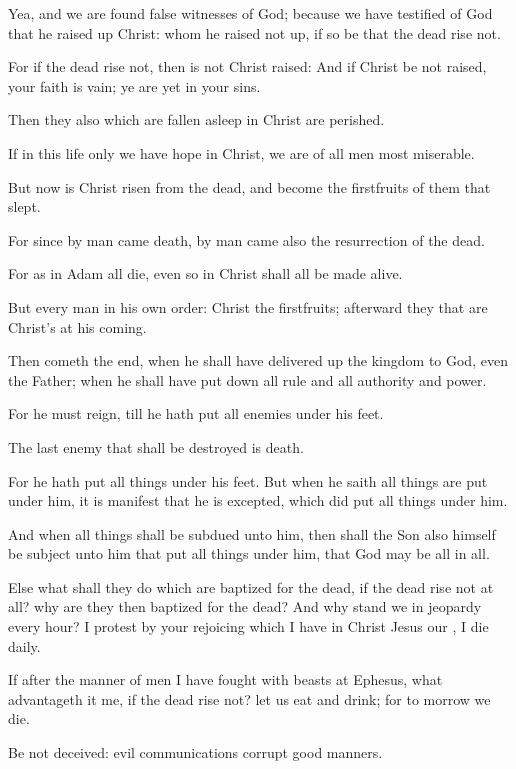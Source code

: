 \verse Yea, and we are found false witnesses of God; because we have testified of God that he raised up Christ: whom he raised not up, if so be that the dead rise not.

\verse For if the dead rise not, then is not Christ raised: \verse And if Christ be not raised, your faith is vain; ye are yet in your sins.

\verse Then they also which are fallen asleep in Christ are perished.

\verse If in this life only we have hope in Christ, we are of all men most miserable.

\verse But now is Christ risen from the dead, and become the firstfruits of them that slept.

\verse For since by man came death, by man came also the resurrection of the dead.

\verse For as in Adam all die, even so in Christ shall all be made alive.

\verse But every man in his own order: Christ the firstfruits; afterward they that are Christ's at his coming.

\verse Then cometh the end, when he shall have delivered up the kingdom to God, even the Father; when he shall have put down all rule and all authority and power.

\verse For he must reign, till he hath put all enemies under his feet.

\verse The last enemy that shall be destroyed is death.

\verse For he hath put all things under his feet. But when he saith all things are put under him, it is manifest that he is excepted, which did put all things under him.

\verse And when all things shall be subdued unto him, then shall the Son also himself be subject unto him that put all things under him, that God may be all in all.

\verse Else what shall they do which are baptized for the dead, if the dead rise not at all? why are they then baptized for the dead?  \verse And why stand we in jeopardy every hour?  \verse I protest by your rejoicing which I have in Christ Jesus our \LORD, I die daily.

\verse If after the manner of men I have fought with beasts at Ephesus, what advantageth it me, if the dead rise not? let us eat and drink; for to morrow we die.

\verse Be not deceived: evil communications corrupt good manners.

